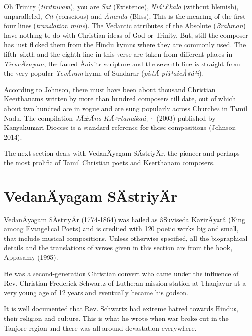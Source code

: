 Oh Trinity (\textit{tirittuvam}), you are \textit{Sat} (Existence), \textit{Niá¹£kala} (without blemish), unparalleled, \textit{Cit} (conscious) and \textit{Änanda} (Bliss). This is the meaning of the first four lines (\textit{translation mine}). The Vedantic attributes of the Absolute (\textit{Brahman}) have nothing to do with Christian ideas of God or Trinity. But, still the composer has just flicked them from the Hindu hymns where they are commonly used. The fifth, sixth and the eighth line in this verse are taken from different places in \textit{TiruvÄsagam}, the famed Åaivite scripture and the seventh line is straight from the very popular \textit{TevÄram} hymn of Sundarar (\textit{pittÄ piá¹aicÅ«á¹­i}).

According to Johnson, there must have been about thousand Christian Keerthanams written by more than hundred composers till date, out of which about two hundred are in vogue and are sung popularly across Churches in Tamil Nadu. The compilation \textit{JÃ±Äna KÄ«rtanaikaá¸·} (2003) published by Kanyakumari Diocese is a standard reference for these compositions (Johnson 2014).

The next section deals with VedanÄyagam SÄstriyÄr, the pioneer and perhaps the most prolific of Tamil Christian poets and Keerthanam composers.


\section*{VedanÄyagam SÄstriyÄr}

VedanÄyagam SÄstriyÄr (1774-1864) was hailed as âSuviseda KavirÄyarâ (King among Evangelical Poets) and is credited with 120 poetic works big and small, that include musical compositions. Unless otherwise specified, all the biographical details and the translations of verses given in this section are from the book, Appasamy (1995).

He was a second-generation Christian convert who came under the influence of Rev. Christian Frederick Schwartz of Lutheran mission station at Thanjavur at a very young age of 12 years and eventually became his godson.

It is well documented that Rev. Schwartz had extreme hatred towards Hindus, their religion and culture. This is what he wrote when war broke out in the Tanjore region and there was all around devastation everywhere.

